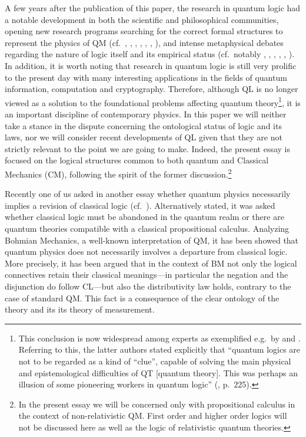 \documentclass[11pt, executivepaper]{article}
\begin{document}
A few years after the publication of this paper, the research in quantum logic had a notable development in both the scientific and philosophical communities, opening new research programs searching for the correct formal structures to represent the physics of QM (cf.\ \cite{Reichenbach:1944}, \cite{Mackey:1957}, \cite{Finkelstein:1963}, \cite{Kochen:1965}, \cite{Jauch:1969}, \cite{Giuntini:2002}, \cite{DallaChiara:2004}), and intense metaphysical debates regarding the nature of logic itself and its empirical status (cf.\ notably \cite{Quine:1951}, \cite{Putnam:1968}, \cite{Dummett:1976}, \cite{Hallett:1982}, \cite{Weingartner:2004}, \cite{Bacciagaluppi:2009}). In addition, it is worth noting that research in quantum logic is still very prolific to the present day with many interesting applications in the fields of quantum information, computation and cryptography. Therefore, although QL is no longer viewed as a solution to the foundational problems affecting quantum theory\footnote{This conclusion is now widespread among experts as exemplified e.g.\ by \cite{Bacciagaluppi:2009} and \cite{Giuntini:2002}. Referring to this, the latter authors stated explicitly that ``quantum logics are not to be regarded as a kind of ``clue'', capable of solving the main physical and epistemological difficulties of QT [quantum theory]. This was perhaps an illusion of some pioneering workers in quantum logic'' (\cite{Giuntini:2002}, p.\ 225).}, it is an important discipline of contemporary physics. In this paper we will neither take a stance in the dispute concerning the ontological status of logic and its laws, nor we will consider recent developments of QL given that they are not strictly relevant to the point we are going to make. Indeed, the present essay is focused on the logical structures common to both quantum and Classical Mechanics (CM), following the spirit of the former discussion.\footnote{In the present essay we will be concerned only with propositional calculus in the context of non-relativistic QM. First order and higher order logics will not be discussed here as well as the logic of relativistic quantum theories.} 

Recently one of us asked in another essay whether quantum physics necessarily implies a revision of classical logic (cf.\ \cite{Oldofredi:2020}). Alternatively stated, it was asked whether classical logic must be abandoned in the quantum realm or there are quantum theories compatible with a classical propositional calculus. Analyzing Bohmian Mechanics, a well-known interpretation of QM, it has been showed that quantum physics does not necessarily involves a departure from classical logic. More precisely, it has been argued that in the context of BM not only the logical connectives retain their classical meanings---in particular the negation and the disjunction do follow CL---but also the distributivity law holds, contrary to the case of standard QM. This fact is a consequence of the clear ontology of the theory and its its theory of measurement.
\end{document}
